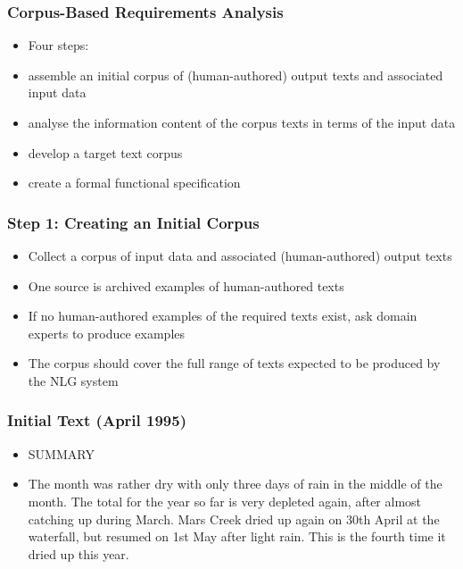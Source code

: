 \documentclass[compress,color=usenames]{beamer}
\begin{document}
\begin{frame}
\frametitle{Corpus-Based Requirements Analysis}

\label{f80}
\begin{itemize}
\item { {Four steps:}}
\item { {assemble an initial corpus of (human-authored) output texts and associated input data}}
\item { {analyse the information content of the corpus texts in terms of the input data}}
\item { {develop a target text corpus}}
\item { {create a formal functional specification}}
\end{itemize}

\end{frame}

\begin{frame}
\frametitle{Step 1: Creating an Initial Corpus}

\label{f82}
\begin{itemize}
\item { {Collect a corpus of input data and associated (human-authored) output texts}}
\item { {One source is archived examples of human-authored texts}}
\item { {If no human-authored examples of the required texts exist, ask domain experts to produce examples}}
\item { {The corpus should cover the full range of texts expected to be produced by the NLG system}}
\end{itemize}

\end{frame}

\begin{frame}
\frametitle{Initial Text (April 1995)}

\label{f84}
\begin{itemize}
\item { {SUMMARY}}
\item { {The month was rather dry with only three days of rain in the middle of the month. The total for the year so far is very depleted again, after almost catching up during March. Mars Creek dried up again on 30th April at the waterfall, but resumed on 1st May after light rain. This is the fourth time it dried up this year.}}
\end{itemize}

\end{frame}
\end{document}
